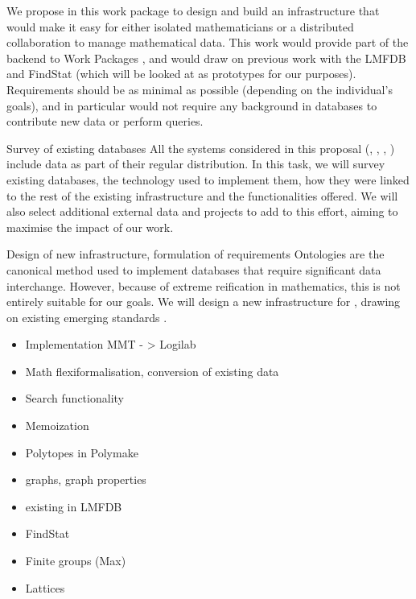 \begin{Workpackage}{\thewpno}
\begin{WPDescription}
We propose in this work package to design and build an infrastructure that would make it easy for either isolated mathematicians or a distributed collaboration to manage mathematical data. This work would provide part of the backend to Work Packages , and would draw on previous work with the LMFDB and FindStat (which will be looked at as prototypes for our purposes). Requirements should be as minimal as possible (depending on the individual's goals), and in particular would not require any background in databases to contribute new data or perform queries. 
\end{WPDescription}

\begin{task}{Survey of existing databases}
\label{task:data_assessment}
All the systems considered in this proposal (\GAP, \Sage, \Pari, \Singular) include data as part of their regular distribution. In this task, we will survey existing databases, the technology used to implement them, how they were linked to the rest of the existing infrastructure and the functionalities offered. We will also select additional external data and projects to add to this effort, aiming to maximise the impact of our work. 
\end{task}

\begin{task}{Design of new infrastructure, formulation of requirements}
\label{task:data_design}
Ontologies are the canonical method used to implement databases that require significant data interchange. However, because of extreme reification in mathematics, this is not entirely suitable for our goals. We will design a new infrastructure for \TheProject, drawing on existing emerging standards . 
\end{task}

\begin{itemize}
\item Implementation MMT - > Logilab
\item Math flexiformalisation, conversion of existing data
\item Search functionality
\item Memoization
\end{itemize}

  \begin{itemize}
  \item Polytopes in Polymake
  \item graphs, graph properties
  \item existing in LMFDB
  \item FindStat
  \item Finite groups (Max)
  \item Lattices
  \end{itemize}



\end{Workpackage}
